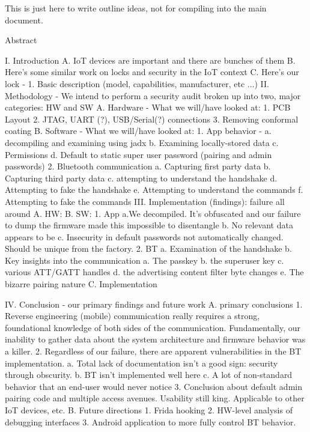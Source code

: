 This is just here to write outline ideas, not for compiling into the main document.

Abstract

I. Introduction
    A. IoT devices are important and there are bunches of them
    B. Here's some similar work on locks and security in the IoT context
    C. Here's our lock -
        1. Basic description (model, capabilities, manufacturer, etc ...)
II. Methodology - We intend to perform a security audit broken up into two, major categories: HW and SW
    A. Hardware - What we will/have looked at:
        1. PCB Layout
        2. JTAG, UART (?), USB/Serial(?) connections
        3. Removing conformal coating
    B. Software - What we will/have looked at:
        1. App behavior -
            a. decompiling and examining using jadx
            b. Examining locally-stored data
            c. Permissions
            d. Default to static super user password (pairing and admin passwords)
        2. Bluetooth communication
            a. Capturing first party data
            b. Capturing third party data
            c. attempting to understand the handshake
            d. Attempting to fake the handshake
            e. Attempting to understand the commands
            f. Attempting to fake the commands
III. Implementation (findings): failure all around
    A. HW:
    B. SW:
        1. App
            a.We decompiled.  It's obfuscated and our failure to dump the firmware made this impossible to disentangle
            b. No relevant data appears to be 
            c. Insecurity in default passwords not automatically changed. Should be unique from the factory.
        2. BT
            a. Examination of the handshake
            b. Key insights into the communication
                a. The passkey
                b. the superuser key
                c. various ATT/GATT handles
                d. the advertising content filter byte changes
                e. The bizarre pairing nature
    C. Implementation
        
IV. Conclusion - our primary findings and future work
    A. primary conclusions
        1. Reverse engineering (mobile) communication really requires a strong, foundational knowledge of both sides of the communication.  Fundamentally, our inability to gather data about the system architecture and firmware behavior was a killer.
        2. Regardless of our failure, there are apparent vulnerabilities in the BT implementation.
            a. Total lack of documentation isn't a good sign: security through obscurity.
            b. BT isn't implemented well here
            c. A lot of non-standard behavior that an end-user would never notice
        3. Conclusion about default admin pairing code and multiple access avenues. Usability still king. Applicable to other IoT devices, etc.
    B. Future directions
        1. Frida hooking
        2. HW-level analysis of debugging interfaces
        3. Android application to more fully control BT behavior.